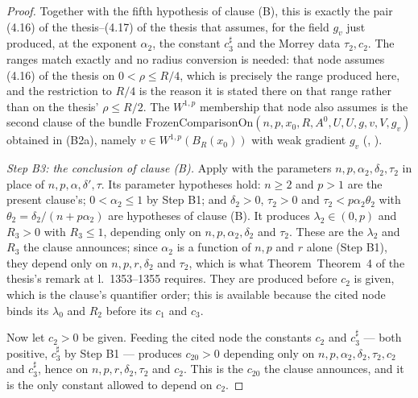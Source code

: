 \begin{proof}
Together with the fifth hypothesis of clause (B), this is exactly the pair
(4.16) of the thesis--(4.17) of the thesis that 
assumes, for the field $g_v$ just produced, at the exponent $\alpha_2$, the
constant $c_3^{\sharp}$ and the Morrey data $\tau_2,c_2$.  The ranges match
exactly and no radius conversion is needed: that node assumes (4.16) of the thesis
on $0<\rho\le R/4$, which is precisely the range produced here, and the
restriction to $R/4$ is the reason it is stated there on that range rather than
on the thesis' $\rho\le R/2$.  The $W^{1,p}$ membership that node also assumes
is the second clause of the bundle
$\mathrm{FrozenComparisonOn}(n,p,x_0,R,A^0,U,U,g,v,V,g_v)$ obtained in (B2a),
namely $v\in W^{1,p}(B_R(x_0))$ with weak gradient $g_v$
(, ).

\emph{Step B3: the conclusion of clause (B).}  Apply
 with the parameters
$n,p,\alpha_2,\delta_2,\tau_2$ in place of $n,p,\alpha,\delta',\tau$.  Its
parameter hypotheses hold: $n\ge2$ and $p>1$ are the present clause's;
$0<\alpha_2\le1$ by Step B1; and $\delta_2>0$, $\tau_2>0$ and
$\tau_2<p\alpha_2\theta_2$ with $\theta_2=\delta_2/(n+p\alpha_2)$ are
hypotheses of clause (B).  It produces $\lambda_2\in(0,p)$ and $R_3>0$ with
$R_3\le1$, depending only on $n,p,\alpha_2,\delta_2$ and $\tau_2$.  These are
the $\lambda_2$ and $R_3$ the clause announces; since $\alpha_2$ is a function
of $n,p$ and $r$ alone (Step B1), they depend only on $n,p,r,\delta_2$ and
$\tau_2$, which is what Theorem~Theorem~4 of the thesis's remark at l.~1353--1355 requires.
They are produced before $c_2$ is given, which is the clause's quantifier
order; this is available because the cited node binds its $\lambda_0$ and $R_2$
before its $c_1$ and $c_3$.

Now let $c_2>0$ be given.  Feeding the cited node the constants $c_2$ and
$c_3^{\sharp}$ --- both positive, $c_3^{\sharp}$ by Step B1 --- produces
$c_{20}>0$ depending only on $n,p,\alpha_2,\delta_2,\tau_2,c_2$ and
$c_3^{\sharp}$, hence on $n,p,r,\delta_2,\tau_2$ and $c_2$.  This is the
$c_{20}$ the clause announces, and it is the only constant allowed to depend on
$c_2$.


\end{proof}
